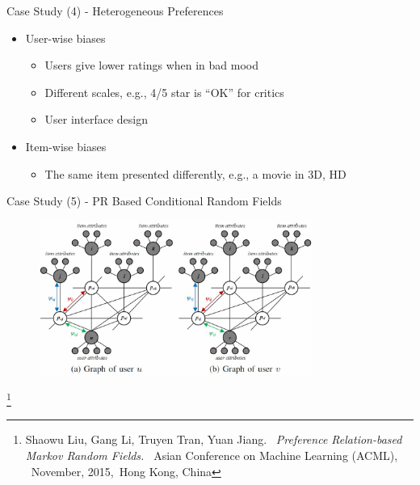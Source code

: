 \documentclass[
 size=14pt,
 paper=smartboard,  %
 mode=present, 		%
 display=slides, 	%
 style=tuliplab,  	%
 pauseslide,
 fleqn,leqno]{powerdot}
\begin{document}
\begin{slide}[toc=,bm=]{Case Study (4) - Heterogeneous Preferences}

\begin{itemize}
\item
User-wise biases

\begin{itemize}
\item
Users give lower ratings when in bad mood

\item
Different scales, e.g., 4/5 star is ``OK'' for critics

\item
User interface design

\end{itemize}

\item
Item-wise biases

\begin{itemize}
\item
The same item presented differently,
e.g., a movie in 3D, HD

\end{itemize}
\end{itemize}
\end{slide}


\begin{slide}[toc=,bm=]{Case Study (5) - PR Based Conditional Random Fields}

\begin{figure}
	\includegraphics[width=0.8\textwidth]{figures//theme3//Theme3_5_1.eps}
\end{figure}

\footnote{Shaowu Liu, Gang Li, Truyen Tran, Yuan Jiang. 
\emph{Preference Relation-based Markov Random Fields. }
Asian Conference on Machine Learning (ACML),  November, 2015, Hong Kong, China}

\end{slide}
\end{document}
